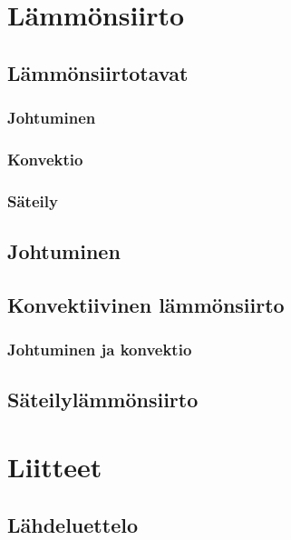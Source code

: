 \documentclass[12pt,a4paper,finnish]{book}
\begin{document}
\part{Lämmönsiirto} %
\setcounter{chapter}{0}

\chapter{Lämmönsiirtotavat}
\section{Johtuminen}
\section{Konvektio}
\section{Säteily}

\chapter{Johtuminen}

\chapter{Konvektiivinen lämmönsiirto}
\section{Johtuminen ja konvektio}

\chapter{Säteilylämmönsiirto}

\part*{Liitteet} %
\setcounter{chapter}{0}

\chapter{Lähdeluettelo} %

{}

\end{document}
